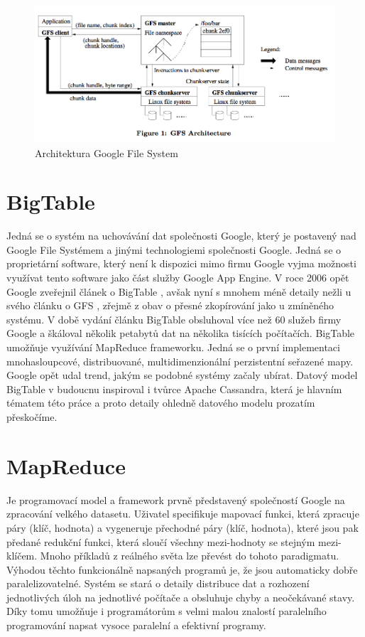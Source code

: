 \begin{figure}[h]
\centering
\includegraphics[scale=0.5]{images/gfs}
\caption{Architektura Google File System \cite{gfs}}
\label{fig:3v}
\end{figure}

\section{BigTable}
Jedná se o systém na uchovávání dat společnosti Google, který je postavený nad Google File Systémem a jinými technologiemi společnosti Google. Jedná se o proprietární software, který není k dispozici mimo firmu Google vyjma možnosti využívat tento software jako část služby Google App Engine. V roce 2006 opět Google zveřejnil článek o BigTable \cite{bigtable}, avšak nyní s mnohem méně detaily nežli u svého článku o GFS \cite{gfs}, zřejmě z obav o přesné zkopírování jako u zmíněného systému. V době vydání článku BigTable obsluhoval více než 60 služeb firmy Google a škáloval několik petabytů dat na několika tisících počítačích. BigTable umožňuje využívání MapReduce frameworku. Jedná se o první implementaci mnohasloupcové, distribuované, multidimenzionální perzistentní seřazené mapy. Google opět udal trend, jakým se podobné systémy začaly ubírat. Datový model BigTable v budoucnu inspiroval i tvůrce Apache Cassandra, která je hlavním tématem této práce a proto detaily ohledně datového modelu prozatím přeskočíme.

\section{MapReduce}
Je programovací model a framework prvně představený společností Google \cite{mapreduce} na zpracování velkého datasetu. Uživatel specifikuje mapovací funkci, která zpracuje páry (klíč, hodnota) a vygeneruje přechodné páry (klíč, hodnota), které jsou pak předané redukční funkci, která sloučí všechny mezi-hodnoty se stejným mezi-klíčem. Mnoho příkladů z reálného světa lze převést do tohoto paradigmatu. Výhodou těchto funkcionálně napsaných programů je, že jsou automaticky dobře paralelizovatelné. Systém se stará o detaily distribuce dat a rozhození jednotlivých úloh na jednotlivé počítače a obsluhuje chyby a neočekávané stavy. Díky tomu umožňuje i programátorům s velmi malou znalostí paralelního programování napsat vysoce paralelní a efektivní programy. 

